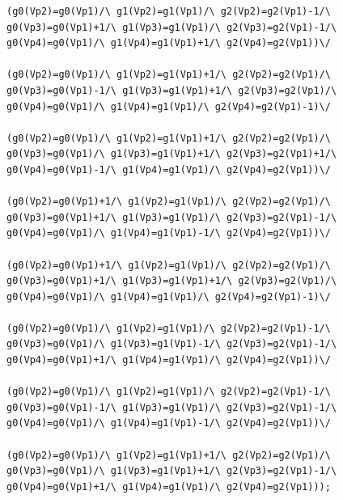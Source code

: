 \begin{appendices}
\begin{lstlisting}
(g0(Vp2)=g0(Vp1)/\ g1(Vp2)=g1(Vp1)/\ g2(Vp2)=g2(Vp1)-1/\ g0(Vp3)=g0(Vp1)+1/\ g1(Vp3)=g1(Vp1)/\ g2(Vp3)=g2(Vp1)-1/\ g0(Vp4)=g0(Vp1)/\ g1(Vp4)=g1(Vp1)+1/\ g2(Vp4)=g2(Vp1))\/ 

(g0(Vp2)=g0(Vp1)/\ g1(Vp2)=g1(Vp1)+1/\ g2(Vp2)=g2(Vp1)/\ g0(Vp3)=g0(Vp1)-1/\ g1(Vp3)=g1(Vp1)+1/\ g2(Vp3)=g2(Vp1)/\ g0(Vp4)=g0(Vp1)/\ g1(Vp4)=g1(Vp1)/\ g2(Vp4)=g2(Vp1)-1)\/ 

(g0(Vp2)=g0(Vp1)/\ g1(Vp2)=g1(Vp1)+1/\ g2(Vp2)=g2(Vp1)/\ g0(Vp3)=g0(Vp1)/\ g1(Vp3)=g1(Vp1)+1/\ g2(Vp3)=g2(Vp1)+1/\ g0(Vp4)=g0(Vp1)-1/\ g1(Vp4)=g1(Vp1)/\ g2(Vp4)=g2(Vp1))\/ 

(g0(Vp2)=g0(Vp1)+1/\ g1(Vp2)=g1(Vp1)/\ g2(Vp2)=g2(Vp1)/\ g0(Vp3)=g0(Vp1)+1/\ g1(Vp3)=g1(Vp1)/\ g2(Vp3)=g2(Vp1)-1/\ g0(Vp4)=g0(Vp1)/\ g1(Vp4)=g1(Vp1)-1/\ g2(Vp4)=g2(Vp1))\/ 

(g0(Vp2)=g0(Vp1)+1/\ g1(Vp2)=g1(Vp1)/\ g2(Vp2)=g2(Vp1)/\ g0(Vp3)=g0(Vp1)+1/\ g1(Vp3)=g1(Vp1)+1/\ g2(Vp3)=g2(Vp1)/\ g0(Vp4)=g0(Vp1)/\ g1(Vp4)=g1(Vp1)/\ g2(Vp4)=g2(Vp1)-1)\/ 

(g0(Vp2)=g0(Vp1)/\ g1(Vp2)=g1(Vp1)/\ g2(Vp2)=g2(Vp1)-1/\ g0(Vp3)=g0(Vp1)/\ g1(Vp3)=g1(Vp1)-1/\ g2(Vp3)=g2(Vp1)-1/\ g0(Vp4)=g0(Vp1)+1/\ g1(Vp4)=g1(Vp1)/\ g2(Vp4)=g2(Vp1))\/ 

(g0(Vp2)=g0(Vp1)/\ g1(Vp2)=g1(Vp1)/\ g2(Vp2)=g2(Vp1)-1/\ g0(Vp3)=g0(Vp1)-1/\ g1(Vp3)=g1(Vp1)/\ g2(Vp3)=g2(Vp1)-1/\ g0(Vp4)=g0(Vp1)/\ g1(Vp4)=g1(Vp1)-1/\ g2(Vp4)=g2(Vp1))\/ 

(g0(Vp2)=g0(Vp1)/\ g1(Vp2)=g1(Vp1)+1/\ g2(Vp2)=g2(Vp1)/\ g0(Vp3)=g0(Vp1)/\ g1(Vp3)=g1(Vp1)+1/\ g2(Vp3)=g2(Vp1)-1/\ g0(Vp4)=g0(Vp1)+1/\ g1(Vp4)=g1(Vp1)/\ g2(Vp4)=g2(Vp1)));
\end{lstlisting}

\end{appendices}
